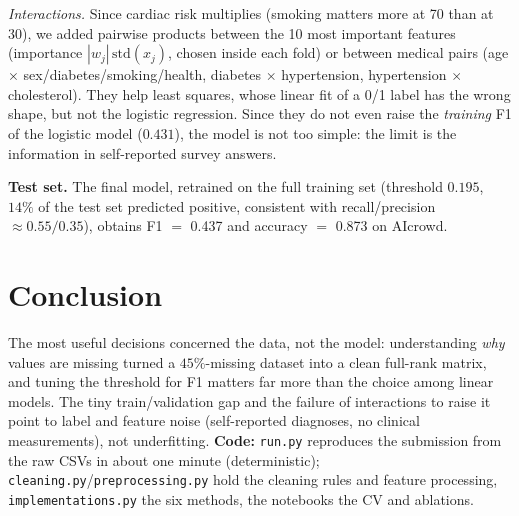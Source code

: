 \documentclass[10pt,conference,compsocconf]{IEEEtran}
\begin{document}
\emph{Interactions.} Since cardiac risk multiplies (smoking matters more at 70 than at 30), we added pairwise products between the 10 most important features (importance $|w_j|\,\mathrm{std}(x_j)$, chosen inside each fold) or between medical pairs (age $\times$ sex/diabetes/smoking/health, diabetes $\times$ hypertension, hypertension $\times$ cholesterol). They help least squares, whose linear fit of a 0/1 label has the wrong shape, but not the logistic regression. Since they do not even raise the \emph{training} F1 of the logistic model ($0.431$), the model is not too simple: the limit is the information in self-reported survey answers.

\textbf{Test set.} The final model, retrained on the full training set (threshold $0.195$, $14\%$ of the test set predicted positive, consistent with recall/precision $\approx 0.55/0.35$), obtains F1 $=$ 0.437 and accuracy $=$ 0.873 on AIcrowd.

\section{Conclusion}
The most useful decisions concerned the data, not the model: understanding \emph{why} values are missing turned a $45\%$-missing dataset into a clean full-rank matrix, and tuning the threshold for F1 matters far more than the choice among linear models. The tiny train/validation gap and the failure of interactions to raise it point to label and feature noise (self-reported diagnoses, no clinical measurements), not underfitting. \textbf{Code:} \texttt{run.py} reproduces the submission from the raw CSVs in about one minute (deterministic); \texttt{cleaning.py}/\texttt{preprocessing.py} hold the cleaning rules and feature processing, \texttt{implementations.py} the six methods, the notebooks the CV and ablations.
\end{document}
